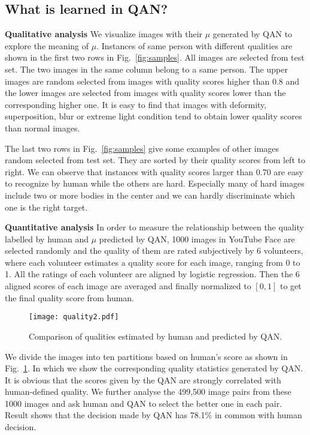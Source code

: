 \documentclass[10pt,twocolumn,letterpaper]{article}
\begin{document}
\subsection{What is learned in QAN?}


\textbf{Qualitative analysis} 
We visualize images with their $\mu$ generated by QAN to explore the meaning of $\mu$. Instances of same person with different qualities are shown in the first two rows in Fig.~\ref{fig:samples}. All images are selected from test set. The two images in the same column belong to a same person. The upper images are random selected from images with quality scores higher than 0.8 and the lower images are selected from images with quality scores lower than the corresponding higher one. It is easy to find that images with deformity, superposition, blur or extreme light condition tend to obtain lower quality scores than normal images.

The last two rows in Fig.~\ref{fig:samples} give some examples of other images random selected from test set. They are sorted by their quality scores from left to right. We can observe that instances with quality scores larger than 0.70 are easy to recognize by human while the others are hard. Especially many of hard images include two or more bodies in the center and we can hardly discriminate which one is the right target. 

\textbf{Quantitative analysis} 
In order to measure the relationship between the quality labelled by human and $\mu$ predicted by QAN, 1000 images in YouTube Face are selected randomly and the quality of them are rated subjectively by 6 volunteers, where each volunteer estimates a quality score for each image, ranging from 0 to 1. All the ratings of each volunteer are aligned by logistic regression. Then the 6 aligned scores of each image are averaged and finally normalized to $[0,1]$ to get the final quality score from human. 


\begin{figure}[!htb]
\centering
  \texttt{[image: quality2.pdf]}
  \caption{Comparison of qualities estimated by human and predicted by QAN.}
  \label{fig:quality}
\endminipage\hfill

\end{figure}

We divide the images into ten partitions based on human's score as shown in Fig.~\ref{fig:quality}. In which we show the corresponding quality statistics generated by QAN. It is obvious that the scores given by the QAN are strongly correlated with human-defined quality. We further analyse the 499,500 image pairs from these 1000 images and ask human and QAN to select the better one in each pair.  Result shows that the decision made by QAN has 78.1\% in common with human decision.
\end{document}
